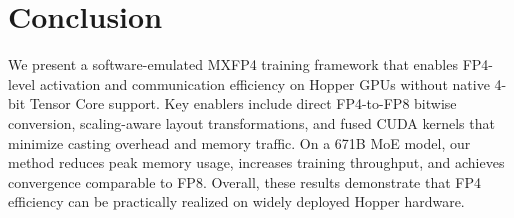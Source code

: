 \section{Conclusion}
\label{sec:conclusion}


We present a software-emulated MXFP4 training framework that enables FP4-level activation and communication efficiency on Hopper GPUs without native 4-bit Tensor Core support. Key enablers include direct FP4-to-FP8 bitwise conversion, scaling-aware layout transformations, and fused CUDA kernels that minimize casting overhead and memory traffic. On a 671B MoE model, our method reduces peak memory usage, increases training throughput, and achieves convergence comparable to FP8. Overall, these results demonstrate that FP4 efficiency can be practically realized on widely deployed Hopper hardware.

